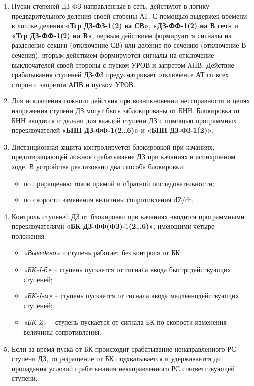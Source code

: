 \begin{enumerate}[label=\arabic{section}.\arabic{subsection}.\arabic*,  align=left, labelsep=4pt, leftmargin=0pt, itemindent=57pt]
\item
Пуски степеней ДЗ-ФЗ направленные в сеть, действуют в логику предварительного деления своей
стороны АТ. С помощью выдержек времени в логике деления \textbf{«Тср ДЗ-ФЗ-1(2) на СВ»}, \textbf{«ДЗ-ФФ-1(2) на В сеч»}
и \textbf{«Тср ДЗ-ФФ-1(2) на В»}, первым действием формируются сигналы на разделение секции (отключение СВ)
или деление по сечению (отключение В сечения), вторым действием формируются сигналы на отключение
выключателей своей стороны с пуском УРОВ и запретом АПВ. Действие срабатывания ступеней ДЗ-ФЗ
предусматривает отключение АТ со всех сторон с запретом АПВ и пуском УРОВ.

\item
Для исключения ложного действия при возникновении неисправности в цепях напряжения ступени ДЗ
могут быть заблокированы от БНН. Блокировка от БНН вводится отдельно для каждой ступени ДЗ с помощью
программных переключателей \textbf{«БНН ДЗ-ФФ-1(2…6)»} и \textbf{«БНН ДЗ-ФЗ-1(2)»}.

\item
Дистанционная защита контролируется блокировкой при качаниях, предотвращающей ложное
срабатывание ДЗ при качаниях и асинхронном ходе. В устройстве реализовано два способа блокировки:
\begin{itemize}
\item по приращению токов прямой и обратной последовательности;
\item по скорости изменения величины сопротивления dZ/dt.
\end{itemize}

\item
Контроль ступеней ДЗ от блокировки при качаниях вводится программными переключателями
\textbf{«БК ДЗ-ФФ(ФЗ)-1(2…6)»}, имеющими четыре положения:
\begin{itemize}
\item \textit{«Выведено»} -- ступень работает без контроля от БК;
\item \textit{«БК-I-б»} -- ступень пускается от сигнала ввода быстродействующих ступеней;
\item \textit{«БК-I-м»} -- ступень пускается от сигнала ввода медленнодействующих ступеней;
\item \textit{«БК-Z»} -- ступень пускается от сигнала БК по скорости изменения величины сопротивления.
\end{itemize}

\item
Если за время пуска от БК происходит срабатывание ненаправленного РС ступени ДЗ, то разращение
от БК подхватывается и удерживается до пропадания условий срабатывания ненаправленного РС
соответствующей ступени.


\end{enumerate}
